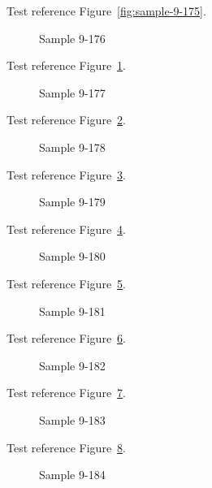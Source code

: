 Test reference Figure~\ref{fig:sample-9-175}.

\begin{figure}[tbhp]
\caption{Sample 9-176}
\label{fig:sample-9-176}
\end{figure}

Test reference Figure~\ref{fig:sample-9-176}.

\begin{figure}[tbhp]
\caption{Sample 9-177}
\label{fig:sample-9-177}
\end{figure}

Test reference Figure~\ref{fig:sample-9-177}.

\begin{figure}[tbhp]
\caption{Sample 9-178}
\label{fig:sample-9-178}
\end{figure}

Test reference Figure~\ref{fig:sample-9-178}.

\begin{figure}[tbhp]
\caption{Sample 9-179}
\label{fig:sample-9-179}
\end{figure}

Test reference Figure~\ref{fig:sample-9-179}.

\begin{figure}[tbhp]
\caption{Sample 9-180}
\label{fig:sample-9-180}
\end{figure}

Test reference Figure~\ref{fig:sample-9-180}.

\begin{figure}[tbhp]
\caption{Sample 9-181}
\label{fig:sample-9-181}
\end{figure}

Test reference Figure~\ref{fig:sample-9-181}.

\begin{figure}[tbhp]
\caption{Sample 9-182}
\label{fig:sample-9-182}
\end{figure}

Test reference Figure~\ref{fig:sample-9-182}.

\begin{figure}[tbhp]
\caption{Sample 9-183}
\label{fig:sample-9-183}
\end{figure}

Test reference Figure~\ref{fig:sample-9-183}.

\begin{figure}[tbhp]
\caption{Sample 9-184}
\label{fig:sample-9-184}
\end{figure}

